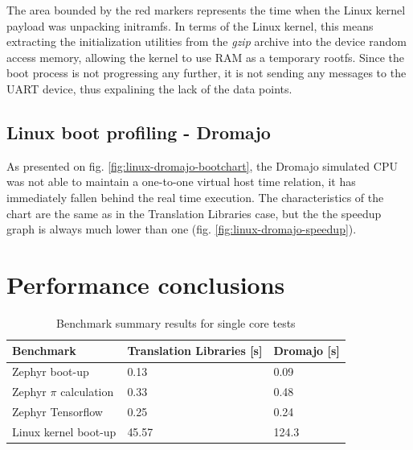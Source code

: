 The area bounded by the red markers represents the time when the Linux kernel payload was unpacking initramfs. In terms
of the Linux kernel, this means extracting the initialization utilities from the \textit{gzip} archive into the
device random access memory, allowing the kernel to use RAM as a temporary rootfs. Since the boot process is not
progressing any further, it is not sending any messages to the UART device, thus expalining the lack of the data
points.

\subsection*{Linux boot profiling - Dromajo}

As presented on fig. \ref{fig:linux-dromajo-bootchart}, the Dromajo simulated CPU was not able to maintain a one-to-one virtual host time relation, it has immediately fallen
behind the real time execution. The characteristics of the chart are the same as in the Translation Libraries case, but the
the speedup graph is always much lower than one (fig. \ref{fig:linux-dromajo-speedup}).

\pagebreak






\pagebreak

\section{Performance conclusions}

\begin{table}[h]
    \centering
    \begin{tabular}{l|l|l}
    Benchmark             & Translation Libraries [s] & Dromajo [s]  \\ \hline
    Zephyr boot-up        & 0.13                  & 0.09     \\ \hline
    Zephyr $\pi$ calculation & 0.33               & 0.48     \\ \hline
    Zephyr Tensorflow     & 0.25                  & 0.24     \\ \hline
    Linux kernel boot-up  & 45.57                 & 124.3
    \end{tabular}
    \caption{Benchmark summary results for single core tests}
\end{table}

